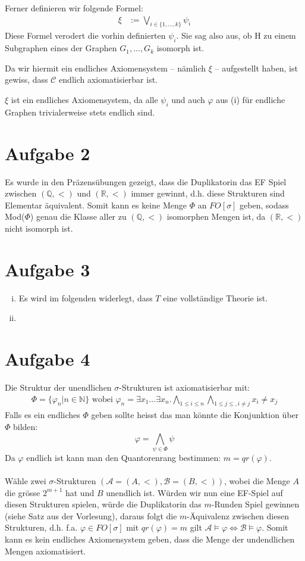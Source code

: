 \documentclass[a4paper,10pt]{article}
\newcommand{\N}{\mathbb{N}}
\begin{document}
\begin{enumerate}[(i)]
Ferner definieren wir folgende Formel:
\begin{align*}
\xi &:= \bigvee_{i \in \{1,...,k\}} \psi_i
\end{align*}
Diese Formel verodert die vorhin definierten $\psi_i$. Sie sag also aus, ob H zu einem Subgraphen eines der Graphen $G_1,...,G_k$ isomorph ist.

Da wir hiermit ein endliches Axiomensystem -- nämlich $\xi$ -- aufgestellt haben, ist gewiss, dass $\mathcal C$ endlich axiomatisierbar ist.

$\xi$ ist ein endliches Axiomensystem, da alle $\psi_i$ und auch $\varphi$ aus (i) für endliche Graphen trivialerweise stets endlich sind. 

\section*{Aufgabe 2}
Es wurde in den Präzensübungen gezeigt, dass die Duplikatorin das EF Spiel zwischen $(\mathbb{Q},<)$ und $(\mathbb{R},<)$ immer gewinnt, d.h. diese Strukturen sind Elementar äquivalent.
Somit kann es keine Menge $\Phi$ an $FO[\sigma]$ geben, sodass Mod($\Phi$) genau die Klasse aller zu $(\mathbb{Q},<)$ isomorphen Mengen ist, da $(\mathbb{R},<)$ nicht isomorph ist.
\section*{Aufgabe 3}
\begin{enumerate}[(i)]
	\item Es wird im folgenden widerlegt, dass $T$ eine vollständige Theorie ist.
	\item 
\end{enumerate}

\section*{Aufgabe 4}
Die Struktur der unendlichen $\sigma$-Strukturen ist axiomatisierbar mit:
\begin{align*}
	\Phi = \{\varphi_n | n \in \N \} \text{ wobei } \varphi_n = \exists x_1 ... \exists x_n. \bigwedge_{1  \le i \le n} \bigwedge_{1 \le j \le, i \neq j} x_i \neq x_j
\end{align*}
Falls es ein endliches $\Phi$ geben sollte heisst das man könnte die Konjunktion über $\Phi$ bilden:
\[\varphi = \bigwedge_{\psi \in \Phi} \psi \]
Da $\varphi$ endlich ist kann man den Quantorenrang bestimmen: $m = qr(\varphi)$. \\
\\
Wähle zwei $\sigma$-Strukturen $(\mathcal{A} = (A,<),\mathcal{B} = (B,<))$, wobei die Menge $A$ die grösse $2^{m+1}$ hat und $B$ unendlich ist. Würden wir nun eine EF-Spiel auf diesen Strukturen spielen, würde die Duplikatorin das $m$-Runden Spiel gewinnen (siehe Satz aus der Vorlesung), daraus folgt die $m$-Äquivalenz zwischen diesen Strukturen, d.h. f.a. $\varphi \in FO[\sigma] $ mit $qr(\varphi) = m$ gilt $\mathcal{A} \vDash \varphi \Leftrightarrow \mathcal{B} \vDash \varphi$. Somit kann es kein endliches Axiomensystem geben, dass die Menge der undendlichen Mengen axiomatisiert.

\end{enumerate}
\end{document}
